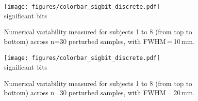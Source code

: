 \documentclass[lettersize,journal]{IEEEtran}
\newcommand{\fmriprep}{\emph{fMRIPrep}\xspace}
\begin{document}
\begin{figure}
  \vspace*{-2cm}
  \centering
  \vspace*{-20pt}\hspace{15pt}
  \texttt{[image: figures/colorbar\_sigbit\_discrete.pdf]} \\
  \vspace*{-5pt}
  significant bits
  \caption{Numerical variability measured for subjects 1 to 8 (from top to bottom) across n=30 perturbed samples, with FWHM\,=\,10\,mm. }
  \label{fig:uncertainty-maps-10mm-disc}
\end{figure}

\begin{figure}
  \vspace*{-2cm}
  \centering
  \vspace*{-20pt}\hspace{15pt}
  \texttt{[image: figures/colorbar\_sigbit\_discrete.pdf]} \\
  \vspace*{-5pt}
  significant bits
  \caption{Numerical variability measured for subjects 1 to 8 (from top to bottom) across n=30 perturbed samples, with FWHM\,=\,20\,mm. }
  \label{fig:uncertainty-maps-20mm-disc}
\end{figure}



\end{document}
